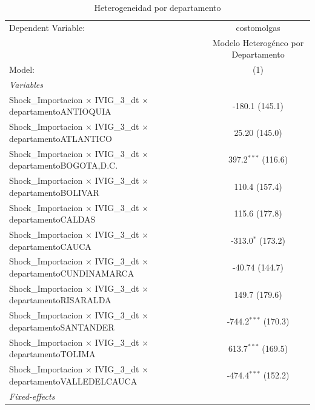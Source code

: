 \documentclass[12pt]{article}
\begin{document}
\setcounter{table}{9}
\begin{table}[htbp]
\centering
\begin{threeparttable}

   \caption{Heterogeneidad por departamento}
   \centering
   \small
   \begin{tabular}{lc}
      \tabularnewline \midrule \midrule
      Dependent Variable:                                                             & costomolgas\\  
                                                                                      & Modelo Heterogéneo por Departamento \\   
      Model:                                                                          & (1)\\  
      \midrule
      \emph{Variables}\\
      Shock\_Importacion $\times$ IVIG\_3\_dt $\times$ departamentoANTIOQUIA          & -180.1 (145.1)\\   
      Shock\_Importacion $\times$ IVIG\_3\_dt $\times$ departamentoATLANTICO          & 25.20 (145.0)\\   
      Shock\_Importacion $\times$ IVIG\_3\_dt $\times$ departamentoBOGOTA,D.C.        & 397.2$^{***}$ (116.6)\\   
      Shock\_Importacion $\times$ IVIG\_3\_dt $\times$ departamentoBOLIVAR            & 110.4 (157.4)\\   
      Shock\_Importacion $\times$ IVIG\_3\_dt $\times$ departamentoCALDAS             & 115.6 (177.8)\\   
      Shock\_Importacion $\times$ IVIG\_3\_dt $\times$ departamentoCAUCA              & -313.0$^{*}$ (173.2)\\   
      Shock\_Importacion $\times$ IVIG\_3\_dt $\times$ departamentoCUNDINAMARCA       & -40.74 (144.7)\\   
      Shock\_Importacion $\times$ IVIG\_3\_dt $\times$ departamentoRISARALDA          & 149.7 (179.6)\\   
      Shock\_Importacion $\times$ IVIG\_3\_dt $\times$ departamentoSANTANDER          & -744.2$^{***}$ (170.3)\\   
      Shock\_Importacion $\times$ IVIG\_3\_dt $\times$ departamentoTOLIMA             & 613.7$^{***}$ (169.5)\\   
      Shock\_Importacion $\times$ IVIG\_3\_dt $\times$ departamentoVALLEDELCAUCA      & -474.4$^{***}$ (152.2)\\   
      \midrule
      \emph{Fixed-effects}\\

\end{tabular}
\end{threeparttable}
\end{table}
\end{document}
